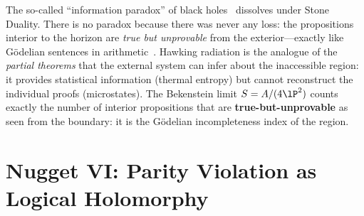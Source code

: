 \begin{result}[title={The Information Paradox as
Incompleteness}]
\label{res:stone-information-paradox}
The so-called ``information paradox'' of black
holes~\cite{hawking1975} dissolves under Stone Duality. There
is no paradox because there was never any loss: the propositions interior
to the horizon are \emph{true but unprovable} from the
exterior---exactly like G\"odelian sentences in
arithmetic~\cite{godel1931}. Hawking radiation is the
analogue of the \emph{partial theorems} that the external system
can infer about the inaccessible region: it provides statistical
information (thermal entropy) but cannot reconstruct the
individual proofs (microstates). The Bekenstein limit
$S = A/(4\lP^2)$ counts exactly the number of interior
propositions that are \textbf{true-but-unprovable} as seen
from the boundary: it is the G\"odelian incompleteness index of the
region.
\end{result}

\section{Nugget VI: Parity Violation as Logical Holomorphy}

